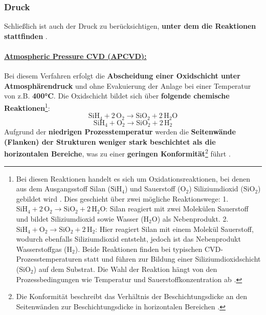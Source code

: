 \documentclass{article} %
\begin{document}
\vspace{1em}
\subsubsection{Druck} %
Schließlich ist auch der Druck zu berücksichtigen, \textbf{unter dem die Reaktionen stattfinden} \cite{keplinger2024CVD}.

\vspace{0.0em}
\paragraph{\uline{Atmospheric Pressure CVD (APCVD):}} Bei diesem Verfahren erfolgt die \textbf{Abscheidung einer Oxidschicht unter 
Atmosphärendruck} und ohne Evakuierung der Anlage bei einer Temperatur von z.B. \textbf{400°C}. Die Oxidschicht bildet sich über \textbf{folgende chemische 
Reaktionen}\footnote{Bei diesen Reaktionen handelt es sich um Oxidationsreaktionen, bei denen aus dem Ausgangsstoff Silan (\(\mathrm{SiH}_4\)) und Sauerstoff 
(\(\mathrm{O}_2\)) Siliziumdioxid (\(\mathrm{SiO}_2\)) gebildet wird \cite{keplinger2024CVD}. Dies geschieht über zwei mögliche Reaktionswege: 1. 
\(\mathrm{SiH}_4 + 2 \, \mathrm{O}_2 \rightarrow \mathrm{SiO}_2 + 2 \, \mathrm{H}_2\mathrm{O}\): Silan reagiert mit zwei Molekülen Sauerstoff und bildet 
Siliziumdioxid sowie Wasser (\(\mathrm{H}_2\mathrm{O}\)) als Nebenprodukt. 2. \(\mathrm{SiH}_4 + \mathrm{O}_2 \rightarrow \mathrm{SiO}_2 + 2 \, \mathrm{H}_2\): 
Hier reagiert Silan mit einem Molekül Sauerstoff, wodurch ebenfalls Siliziumdioxid entsteht, jedoch ist das Nebenprodukt Wasserstoffgas (\(\mathrm{H}_2\)). Beide 
Reaktionen finden bei typischen CVD-Prozesstemperaturen statt und führen zur Bildung einer Siliziumdioxidschicht (\(\mathrm{SiO}_2\)) auf dem Substrat. Die Wahl 
der Reaktion hängt von den Prozessbedingungen wie Temperatur und Sauerstoffkonzentration ab \cite{keplinger2024CVD}.}:
$$
\mathrm{SiH}_4 + 2 \, \mathrm{O}_2 \rightarrow \mathrm{SiO}_2 + 2 \, \mathrm{H}_2\mathrm{O}
$$
$$
\mathrm{SiH}_4 + \mathrm{O}_2 \rightarrow \mathrm{SiO}_2 + 2 \, \mathrm{H}_2
$$
Aufgrund der \textbf{niedrigen Prozesstemperatur} werden die \textbf{Seitenwände (Flanken) der Strukturen weniger stark beschichtet als die horizontalen Bereiche}, 
was zu einer \textbf{geringen Konformität}\footnote{Die Konformität beschreibt das Verhältnis der Beschichtungsdicke an den Seitenwänden zur Beschichtungsdicke in 
horizontalen Bereichen \cite{keplinger2024CVD}.} führt \cite{keplinger2024CVD}.
    
\end{document}

